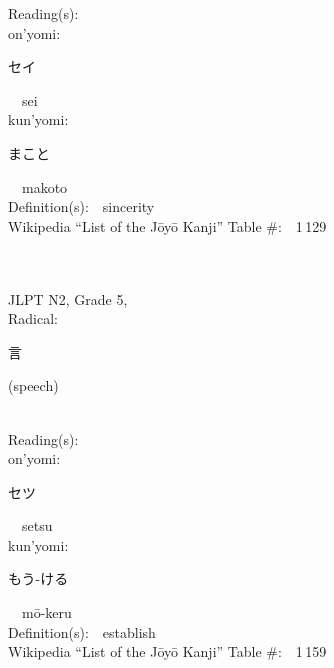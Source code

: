 \begin{multicols}{2}
Reading(s):\ \ \\
{\hspace*{1em}}on'yomi:\ \ \\
{\hspace*{2em}}{\begin{CJK}{UTF8}{min} セイ \end{CJK}}\ \ sei\ \ \\
{\hspace*{1em}}kun'yomi:\ \ \\
{\hspace*{2em}}{\begin{CJK}{UTF8}{min} まこと \end{CJK}}\ \ makoto\ \ \\
Definition(s):\ \ sincerity \\
Wikipedia ``List of the J\=oy\=o Kanji'' Table \#:\ \ 1\,129 \\
\ \ \\
{\fontsize{34pt}{40pt}  }\ \ \\  %
{JLPT N2, Grade 5, \\Radical:\ \ {\begin{CJK}{UTF8}{min} 言 \end{CJK}} (speech) } \\
Reading(s):\ \ \\
{\hspace*{1em}}on'yomi:\ \ \\
{\hspace*{2em}}{\begin{CJK}{UTF8}{min} セツ \end{CJK}}\ \ setsu\ \ \\
{\hspace*{1em}}kun'yomi:\ \ \\
{\hspace*{2em}}{\begin{CJK}{UTF8}{min} もう-ける \end{CJK}}\ \ m\=o-keru\ \ \\
Definition(s):\ \ establish \\
Wikipedia ``List of the J\=oy\=o Kanji'' Table \#:\ \ 1\,159 \\
\ \ \\
{\fontsize{34pt}{40pt}  }\ \ \\  %

\end{multicols}

